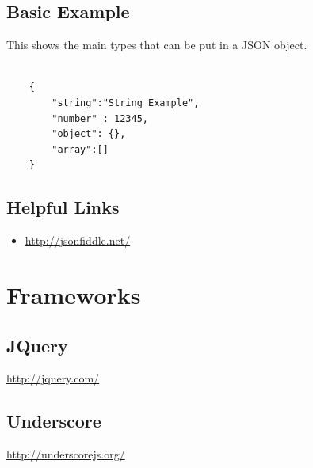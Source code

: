 \documentclass {amsart}
\begin{document}
	\subsection {Basic Example}  This shows the main types that can be put in a JSON object. 
	
	\begin{lstlisting}

	{
		"string":"String Example",
   		"number" : 12345,
   		"object": {},
   		"array":[]
  	}

	\end{lstlisting}

	\subsection{Helpful Links}
		\begin{itemize}
			\item \url{http://jsonfiddle.net/}
		\end{itemize}

\section{Frameworks}
	\subsection{JQuery}
		\url{http://jquery.com/}
	\subsection{Underscore}
		\url{http://underscorejs.org/}
\end{document}
